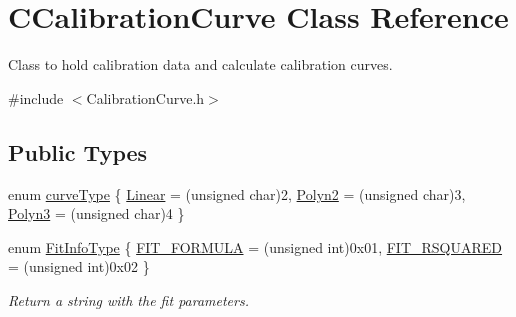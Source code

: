 \hypertarget{classCCalibrationCurve}{
\section{CCalibrationCurve Class Reference}
\label{classCCalibrationCurve}
}


Class to hold calibration data and calculate calibration curves.  




{\ttfamily \#include $<$CalibrationCurve.h$>$}

\subsection*{Public Types}
\begin{DoxyCompactItemize}
\item 
enum \hyperlink{classCCalibrationCurve_ab9d3dc7e1f672a8bd6b7705f94798b7a}{curveType} \{ \hyperlink{classCCalibrationCurve_ab9d3dc7e1f672a8bd6b7705f94798b7aad184b8f95bee845df76b10e8efb2055f}{Linear} =  (unsigned char)2, 
\hyperlink{classCCalibrationCurve_ab9d3dc7e1f672a8bd6b7705f94798b7aaf2225c7e6d9d2f917d06ee37239a5742}{Polyn2} =  (unsigned char)3, 
\hyperlink{classCCalibrationCurve_ab9d3dc7e1f672a8bd6b7705f94798b7aad7bc14f586131cf28f8e724fe61aa6a8}{Polyn3} =  (unsigned char)4
 \}
\item 
enum \hyperlink{classCCalibrationCurve_ab445458ebea97f43ffb079e88ac1ab1b}{FitInfoType} \{ \hyperlink{classCCalibrationCurve_ab445458ebea97f43ffb079e88ac1ab1ba18edc584634ffdbac3bd86c8d3645453}{FIT\_\-FORMULA} =  (unsigned int)0x01, 
\hyperlink{classCCalibrationCurve_ab445458ebea97f43ffb079e88ac1ab1bac3f78c18b83515aef2a2774fbc5f9113}{FIT\_\-RSQUARED} =  (unsigned int)0x02
 \}
\begin{DoxyCompactList}\small\item\em Return a string with the fit parameters. \item\end{DoxyCompactList}\end{DoxyCompactItemize}
